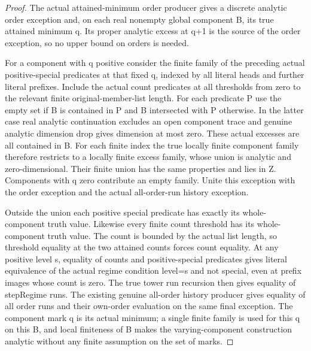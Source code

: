 \begin{proof}
The actual attained-minimum order producer gives a discrete analytic order
exception and, on each real nonempty global component B, its true attained
minimum q. Its proper analytic excess at q+1 is the source of the order
exception, so no upper bound on orders is needed.

For a component with q positive consider the finite family of the preceding
actual positive-special predicates at that fixed q, indexed by all literal
heads and further literal prefixes. Include the actual count predicates at
all thresholds from zero to the relevant finite original-member-list length.
For each predicate P use the empty set if B is contained in P and B intersected
with P otherwise. In the latter case real analytic continuation excludes an
open component trace and genuine analytic dimension drop gives dimension at
most zero. These actual excesses are all contained in B. For each finite index
the true locally finite component family therefore restricts to a locally
finite excess family, whose union is analytic and zero-dimensional. Their
finite union has the same properties and lies in Z. Components with q zero
contribute an empty family. Unite this exception with the order exception
and the actual all-order-run history exception.

Outside the union each positive special predicate has exactly its whole-
component truth value. Likewise every finite count threshold has its whole-
component truth value. The count is bounded by the actual list length, so
threshold equality at the two attained counts forces count equality. At any
positive level s, equality of counts and positive-special predicates gives
literal equivalence of the actual regime condition level=s and not special,
even at prefix images whose count is zero. The true tower run recursion then
gives equality of stepRegime runs. The existing genuine all-order history
producer gives equality of all order runs and their own-order evaluation on
the same final exception. The component mark q is its actual minimum; a
single finite family is used for this q on this B, and local finiteness of
B makes the varying-component construction analytic without any finite
assumption on the set of marks.
\end{proof}

